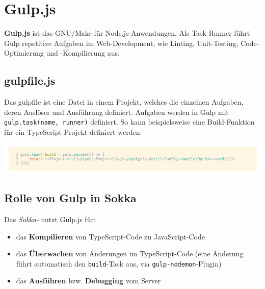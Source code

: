 \section{Gulp.js}
\label{gulpjs}

\textbf{Gulp.js} ist das GNU/Make für Node.js-Anwendungen. Als Task Runner führt Gulp repetitive Aufgaben im Web-Development, wie Linting, Unit-Testing, Code-Optimierung und -Kompilierung aus.

\subsection{gulpfile.js}

Das gulpfile ist eine Datei in einem Projekt, welches die einzelnen Aufgaben, deren Auslöser und Ausführung definiert. Aufgaben werden in Gulp mit \lstinline{gulp.task(name, runner)} definiert. So kann beispielsweise eine Build-Funktion für ein TypeScript-Projekt definiert werden:

\begin{code}[htp]
    \begin{center}
        \includegraphics[width=1\textwidth]{images/Dependencies/gulpfile.png}
        \vspace{-25pt}
        \caption{Beispielhaftes \lstinline{gulpfile.js} zum Kompilieren von TypeScript}
    \end{center}
\end{code}

\subsection{Rolle von Gulp in Sokka}

Das \textit{Sokka-} nutzt Gulp.js für:

\begin{itemize}
    \item das \textbf{Kompilieren} von TypeScript-Code zu JavaScript-Code
    \item das \textbf{Überwachen} von Änderungen im TypeScript-Code (eine Änderung führt automatisch den \lstinline{build}-Task aus, via \lstinline{gulp-nodemon}-Plugin)
    \item das \textbf{Ausführen} bzw. \textbf{Debugging} vom Server
\end{itemize}